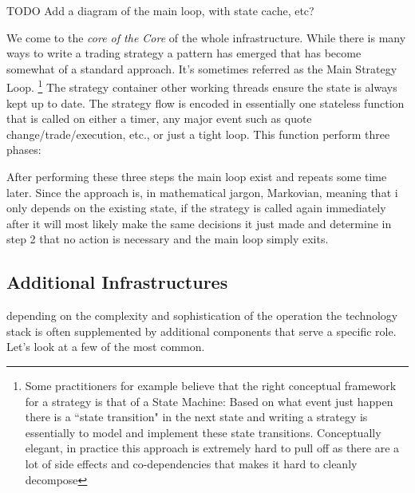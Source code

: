 TODO Add a diagram of the main loop, with state cache, etc?

We come to the \emph{core of the Core} of the whole infrastructure. While there is many ways to write a trading strategy a pattern has emerged that has become somewhat of a standard approach. It's sometimes referred as the Main Strategy Loop. \footnote{Some practitioners for example believe that the right conceptual framework for a strategy is that of a State Machine: Based on what event just happen there is a ``state transition" in the next state and writing a strategy is essentially to model and implement these state transitions. Conceptually elegant, in practice this approach is extremely hard to pull off as there are a lot of side effects and co-dependencies that makes it hard to cleanly decompose}
The strategy container other working threads ensure the state is always kept up to date. The strategy flow is encoded in essentially one stateless function that is called on either a timer, any major event such as quote change/trade/execution, etc., or just a tight loop. This function perform three phases:
After performing these three steps the main loop exist and repeats some time later. Since the approach is, in mathematical jargon, Markovian, meaning that i only depends on the existing state, if the strategy is called again immediately after it will most likely make the same decisions it just made and determine in step 2 that no action is necessary and the main loop simply exits.

\subsection{Additional Infrastructures}
depending on the complexity and sophistication of the operation the technology stack is often supplemented by additional components that serve a specific role. Let's look at a few of the most common.
